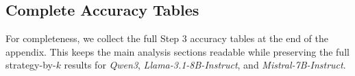 \documentclass[11pt]{article}
\begin{document}




\subsection{Complete Accuracy Tables}
\label{sec:appendix_full_accuracy}
For completeness, we collect the full Step 3 accuracy tables at the end of the appendix. This keeps the main analysis sections readable while preserving the full strategy-by-$k$ results for \textit{Qwen3}, \textit{Llama-3.1-8B-Instruct}, and \textit{Mistral-7B-Instruct}.
\end{document}
